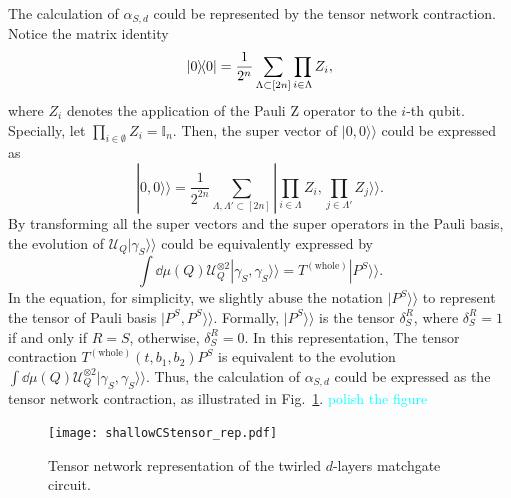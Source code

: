 \documentclass{article}
\newcommand{\Twhole}{T^{(\text{whole})}}
\newcommand{\supket}[1]{|#1 \rangle\rangle}
\begin{document}
The calculation of $\alpha_{S,d}$ could be represented by the tensor network contraction.
Notice the matrix identity 
\begin{equation}
    \ketbra{0} = \frac{1}{2^n} \sum_{\Lambda\subset [2n]} \prod_{i \in \Lambda} Z_i,
\end{equation}
where $Z_i$ denotes the application of the Pauli Z operator to the $i$-th qubit.
Specially, let $\prod_{i \in \emptyset} Z_i = \mathbb{I}_n$. Then, the super vector of $\supket{0,0}$ could be expressed as
\begin{equation}
\label{eq: zz anonymous 6}
    \supket{0,0} = \frac{1}{2^{2n}} \sum_{\Lambda, \Lambda' \subset [2n]}  \supket{\prod_{i \in \Lambda }  Z_i, \prod_{j \in \Lambda'} Z_j}.
\end{equation}
By transforming all the super vectors and the super operators in the Pauli basis, 
the evolution of $\mathcal{U}_Q \supket{\gamma_S}$ could be equivalently expressed by 
\begin{equation}
\label{eq: transfer evolution of U to tensor}
    \int \dd\mu(Q) \mathcal{U}_Q^{\otimes 2} \supket{\gamma_S,\gamma_S} = \Twhole \supket{P^S}.
\end{equation}
In the equation, for simplicity, we slightly abuse the notation $\supket{P^S}$ to represent the tensor of Pauli basis $\supket{P^S, P^S}$. Formally, $\supket{P^S}$ is the tensor $\delta_{S}^{R}$, where $\delta_{S}^{R}=1$ if and only if $R=S$, otherwise, $\delta_{S}^{R}=0$. In this representation, The tensor contraction $\Twhole(t, b_1, b_2) P^S$ is equivalent to the evolution $\int \dd\mu(Q) \mathcal{U}_Q^{\otimes 2} \supket{\gamma_S,\gamma_S}$. Thus, the calculation of $\alpha_{S,d}$ could be expressed as the tensor network contraction, as illustrated in Fig.~\ref{fig:TNcoefRep}. \textcolor{cyan}{polish the figure}
\begin{figure}
    \centering
    \texttt{[image: shallowCStensor\_rep.pdf]}
    \caption{Tensor network representation of the twirled $d$-layers matchgate circuit.}
    \label{fig:TNcoefRep}
\end{figure}
\end{document}
